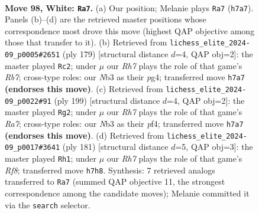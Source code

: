 \documentclass[11pt]{article}
\begin{document}
\clearpage

\begin{figure}[p]\centering
\begin{subfigure}{0.46\textwidth}\centering
\resizebox{\linewidth}{!}{%
\newchessgame
\chessboard[
  setfen={8/7R/3k4/5K2/8/1N6/6P1/3r4 w - - 60 98},
  showmover=false,
  pgfstyle=straightmove, color=movearrow, markmove={h7-a7}
]}
\caption{}
\end{subfigure}\hfill
\begin{subfigure}{0.46\textwidth}\centering
\resizebox{\linewidth}{!}{%
\newchessgame
\chessboard[
  setfen={8/8/8/3k2p1/6P1/8/1r6/R3K3 b - - 7 90},
  showmover=false,
  pgfstyle=straightmove, color=movearrow, markmove={b2-c2}
]}
\caption{}
\end{subfigure}
\\[4pt]
\begin{subfigure}{0.46\textwidth}\centering
\resizebox{\linewidth}{!}{%
\newchessgame
\chessboard[
  setfen={4k3/8/8/5p2/5P2/8/r7/1R2K3 b - - 69 100},
  showmover=false,
  pgfstyle=straightmove, color=movearrow, markmove={a2-g2}
]}
\caption{}
\end{subfigure}\hfill
\begin{subfigure}{0.46\textwidth}\centering
\resizebox{\linewidth}{!}{%
\newchessgame
\chessboard[
  setfen={8/4K3/8/3k3P/8/8/4R3/5r2 b - - 24 91},
  showmover=false,
  pgfstyle=straightmove, color=movearrow, markmove={f1-h1}
]}
\caption{}
\end{subfigure}
\caption{\textbf{Move 98, White: \texttt{Ra7}.} (a) Our position; Melanie plays \texttt{Ra7} (\texttt{h7a7}). Panels (b)--(d) are the retrieved master positions whose correspondence most drove this move (highest QAP objective among those that transfer to it). (b) Retrieved from \texttt{lichess\_elite\_2024-09\_p0005\#2651} (ply 179) [structural distance $d$=4, QAP obj=2]: the master played \texttt{Rc2}; under $\mu$ our \emph{Rh7} plays the role of that game's \emph{Rb7}; cross-type roles: our \emph{N}b3 as their \emph{p}g4; transferred move \texttt{h7a7} \textbf{(endorses this move)}. (c) Retrieved from \texttt{lichess\_elite\_2024-09\_p0022\#91} (ply 199) [structural distance $d$=4, QAP obj=2]: the master played \texttt{Rg2}; under $\mu$ our \emph{Rh7} plays the role of that game's \emph{Ra7}; cross-type roles: our \emph{N}b3 as their \emph{p}f4; transferred move \texttt{h7a7} \textbf{(endorses this move)}. (d) Retrieved from \texttt{lichess\_elite\_2024-09\_p0017\#3641} (ply 181) [structural distance $d$=5, QAP obj=3]: the master played \texttt{Rh1}; under $\mu$ our \emph{Rh7} plays the role of that game's \emph{Rf8}; transferred move \texttt{h7h8}. Synthesis: 7 retrieved analogs transferred to \texttt{Ra7} (summed QAP objective 11, the strongest correspondence among the candidate moves); Melanie committed it via the \texttt{search} selector.}
\label{fig:thought-m194}
\end{figure}
\end{document}
